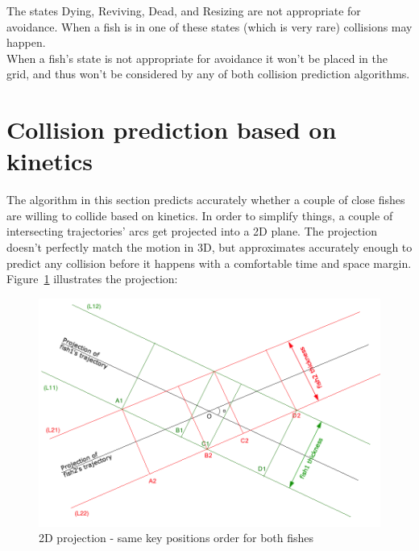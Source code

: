 The states Dying, Reviving, Dead, and Resizing are not appropriate for avoidance. When a fish is in one of these states (which is very rare) collisions may happen.\\

When a fish's state is not appropriate for avoidance it won't be placed in the grid, and thus won't be considered by any of both collision prediction algorithms.

\label{subsec:appropriatestate}


\section{Collision prediction based on kinetics}
\label{sec:dynamic.prediction}

The algorithm in this section predicts accurately whether a couple of close fishes are willing to collide based on kinetics. In order to simplify things, a couple of intersecting trajectories' arcs get projected into a 2D plane. The projection doesn't perfectly match the motion in 3D, but approximates accurately enough to predict any collision before it happens with a comfortable time and space margin. Figure~\ref{fig:projection-abcd} illustrates the projection:

\begin{figure}[H]
   \centering
   \includegraphics[scale=0.5]{figures/projection-abcd.png}
   \caption{2D projection - same key positions order for both fishes}
   \label{fig:projection-abcd}
\end{figure}


